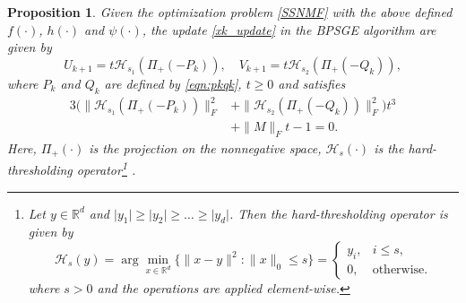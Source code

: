 \documentclass[letterpaper]{article} %
\newtheorem{proposition}{Proposition}
\begin{document}
	\begin{proposition}\label{Prop_SSNMF}
		Given the optimization problem \eqref{SSNMF} with the above defined $f(\cdot)$, $h(\cdot)$ and $\psi(\cdot)$, the update  \eqref{xk_update} in the BPSGE algorithm   are given by 
		\[
		U_{k+1}=t\mathcal{H}_{s_{1}}(\Pi_{+}(-P_{k})), \quad V_{k+1}=t\mathcal{H}_{s_{2}}(\Pi_{+}(-Q_{k})),
		\]
		where $P_k$ and $Q_k$ are defined by \eqref{eqn:pkqk}, $t\ge 0$ and satisfies 
		\[\begin{aligned}
			3(\|\mathcal{H}_{s_{1}}(\Pi_{+}(-P_{k}))\|_{F}^{2}&+\|\mathcal{H}_{s_{2}}(\Pi_{+}(-Q_{k}))\|_{F}^{2})t^{3} \\&+\|M\|_{F}t-1=0.
		\end{aligned}\]
		Here, $\Pi_{+}(\cdot)$ is the projection on the nonnegative space, $\mathcal{H}_{s}(\cdot)$ is the hard-thresholding operator\footnote{Let $y\in\mathbb{R}^{d}$ and   $\vert y_{1}\vert \ge \vert y_{2}\vert \ge \dots  \ge \vert y_{d}\vert$. Then the hard-thresholding operator  is given by
			\[
			\mathcal{H}_{s}(y)=\arg\min_{x\in\mathbb{R}^{d}} \{\|x-y\|^{2}:\|x\|_{0}\le s\}=\begin{cases}
				y_{i},  & i\le s,\\
				0, & \text{otherwise.}
			\end{cases}
			\]
			where $s > 0$ and the operations are applied element-wise.} \cite{LussT13}.
	\end{proposition}
	
\end{document}
